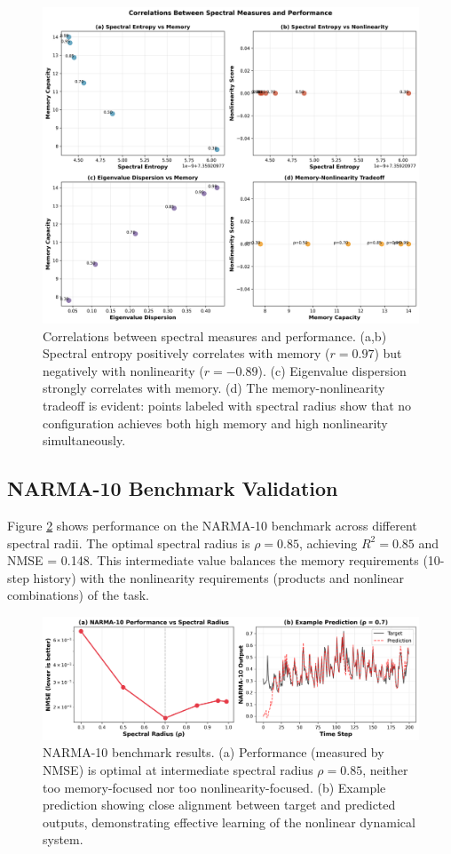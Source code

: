 \documentclass{article}
\begin{document}
\begin{figure}[htbp]
\centering
\includegraphics[width=\textwidth]{fig5_correlations.png}
\caption{Correlations between spectral measures and performance. (a,b) Spectral entropy positively correlates with memory ($r=0.97$) but negatively with nonlinearity ($r=-0.89$). (c) Eigenvalue dispersion strongly correlates with memory. (d) The memory-nonlinearity tradeoff is evident: points labeled with spectral radius show that no configuration achieves both high memory and high nonlinearity simultaneously.}
\label{fig:correlations}
\end{figure}

\subsection{NARMA-10 Benchmark Validation}

Figure \ref{fig:narma} shows performance on the NARMA-10 benchmark across different spectral radii. The optimal spectral radius is $\rho = 0.85$, achieving $R^2 = 0.85$ and NMSE = 0.148. This intermediate value balances the memory requirements (10-step history) with the nonlinearity requirements (products and nonlinear combinations) of the task.

\begin{figure}[htbp]
\centering
\includegraphics[width=\textwidth]{fig6_narma10.png}
\caption{NARMA-10 benchmark results. (a) Performance (measured by NMSE) is optimal at intermediate spectral radius $\rho = 0.85$, neither too memory-focused nor too nonlinearity-focused. (b) Example prediction showing close alignment between target and predicted outputs, demonstrating effective learning of the nonlinear dynamical system.}
\label{fig:narma}
\end{figure}
\end{document}
